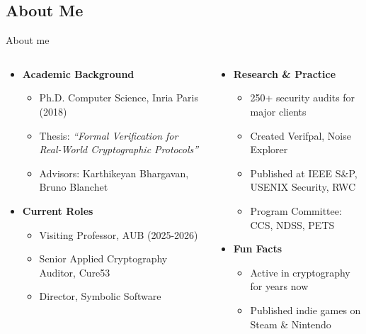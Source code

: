 \documentclass[aspectratio=169, lualatex, handout]{beamer}
\begin{document}
\subsection{About Me}

\begin{frame}{About me}
	\begin{columns}[c]
		\begin{column}{0.5\textwidth}
			\begin{itemize}
				\item \textbf{Academic Background}
				      \begin{itemize}[<+->]
					      \item Ph.D. Computer Science, Inria Paris (2018)
					      \item Thesis: \textit{``Formal Verification for Real-World Cryptographic Protocols''}
					      \item Advisors: Karthikeyan Bhargavan, Bruno Blanchet
				      \end{itemize}
			\end{itemize}
			\begin{itemize}
				\item \textbf{Current Roles}
				      \begin{itemize}[<+->]
					      \item Visiting Professor, AUB (2025-2026)
					      \item Senior Applied Cryptography Auditor, Cure53
					      \item Director, Symbolic Software
				      \end{itemize}
			\end{itemize}
		\end{column}
		\begin{column}{0.5\textwidth}
			\begin{itemize}
				\item \textbf{Research \& Practice}
				      \begin{itemize}[<+->]
					      \item 250+ security audits for major clients
					      \item Created Verifpal, Noise Explorer
					      \item Published at IEEE S\&P, USENIX Security, RWC
					      \item Program Committee: CCS, NDSS, PETS
				      \end{itemize}
			\end{itemize}
			\begin{itemize}
				\item \textbf{Fun Facts}
				      \begin{itemize}[<+->]
					      \item Active in cryptography for  years now
					      \item Published indie games on Steam \& Nintendo
				      \end{itemize}
			\end{itemize}
		\end{column}
	\end{columns}
\end{frame}
\end{document}
